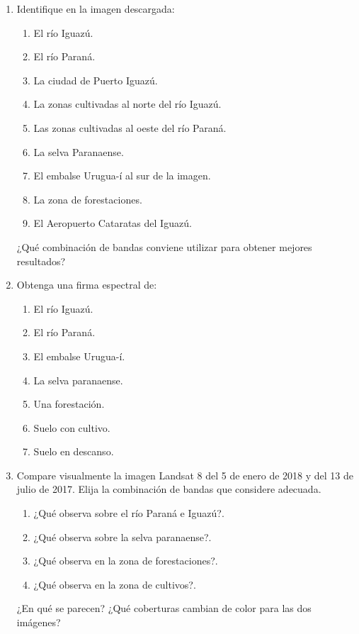 \begin{enumerate}
  \item Identifique en la imagen descargada:
  \begin{enumerate}
    \item El río Iguazú.
    \item El río Paraná.
    \item La ciudad de Puerto Iguazú.
    \item La zonas cultivadas al norte del río Iguazú.
    \item Las zonas cultivadas al oeste del río Paraná.
    \item La selva Paranaense.
    \item El embalse Urugua-í al sur de la imagen.
    \item La zona de forestaciones.
    \item El Aeropuerto Cataratas del Iguazú.
  \end{enumerate}
  ¿Qué combinación de bandas conviene utilizar para obtener mejores resultados?

  \item Obtenga una firma espectral de:
  \begin{enumerate}
    \item El río Iguazú.
    \item El río Paraná.
    \item El embalse Urugua-í.
    \item La selva paranaense.
    \item Una forestación.
    \item Suelo con cultivo.
    \item Suelo en descanso.
  \end{enumerate}

  \item Compare visualmente la imagen Landsat 8 del 5 de enero de 2018 y del 13 de julio de 2017. Elija la combinación de bandas que considere adecuada. 
  \begin{enumerate}
    \item ¿Qué observa sobre el río Paraná e Iguazú?.
    \item ¿Qué observa sobre la selva paranaense?.
    \item ¿Qué  observa en la zona de forestaciones?.
    \item ¿Qué  observa en la zona de cultivos?.
  \end{enumerate}
  ¿En qué se parecen? ¿Qué coberturas cambian de color para las dos imágenes?


\end{enumerate}
